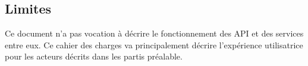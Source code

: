 \subsection{Limites}

Ce document n'a pas vocation à décrire le fonctionnement des API et des services entre eux. Ce cahier des charges va principalement décrire l'expérience utilisatrice pour les acteurs décrits dans les partis préalable. 






